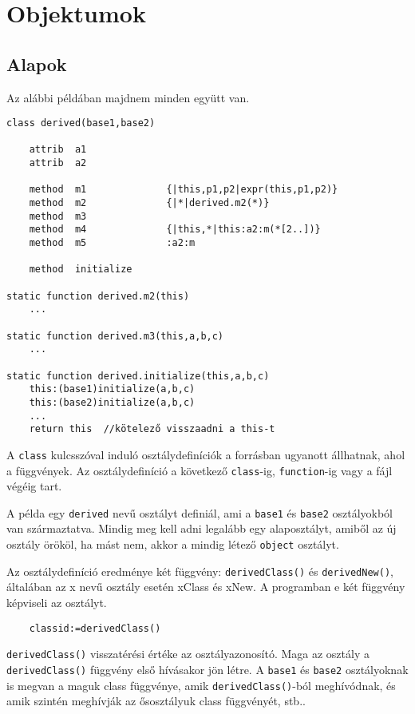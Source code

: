 

\section{Objektumok}


\subsection{Alapok}

Az alábbi példában majdnem minden együtt van.
\begin{verbatim}
class derived(base1,base2)

    attrib  a1
    attrib  a2

    method  m1              {|this,p1,p2|expr(this,p1,p2)}
    method  m2              {|*|derived.m2(*)}
    method  m3
    method  m4              {|this,*|this:a2:m(*[2..])}
    method  m5              :a2:m

    method  initialize

static function derived.m2(this)
    ...

static function derived.m3(this,a,b,c)
    ...

static function derived.initialize(this,a,b,c)
    this:(base1)initialize(a,b,c)
    this:(base2)initialize(a,b,c)
    ...
    return this  //kötelező visszaadni a this-t
\end{verbatim}

A \verb!class! kulcsszóval induló osztálydefiníciók a forrásban ugyanott állhatnak,
ahol a függvények. Az osztálydefiníció a következő \verb!class!-ig, 
\verb!function!-ig vagy a fájl végéig tart.

A példa egy \verb!derived! nevű osztályt definiál, 
ami a \verb!base1! és \verb!base2! osztályokból van származtatva.
Mindig meg kell adni legalább egy alaposztályt, amiből az új osztály
örököl, ha mást nem, akkor a mindig létező \verb!object! osztályt.


Az osztálydefiníció eredménye két függvény:
\verb!derivedClass()! és \verb!derivedNew()!,
általában az x nevű osztály esetén xClass és xNew.
A programban e két függvény képviseli az osztályt.

\begin{verbatim}
    classid:=derivedClass()
\end{verbatim}
\verb!derivedClass()! visszatérési értéke az osztályazonosító.
Maga az osztály a \verb!derivedClass()! függvény első hívásakor jön létre.
A \verb!base1! és \verb!base2! osztályoknak is megvan a maguk class 
függvénye, amik \verb!derivedClass()!-ból meghívódnak, és amik
szintén meghívják az ősosztályuk class függvényét, stb..

